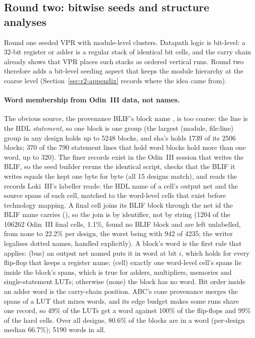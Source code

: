 \subsection{Round two: bitwise seeds and structure analyses}
\label{sec:r2-method}

Round one seeded VPR with module-level clusters. Datapath logic is bit-level: a
32-bit register or adder is a regular stack of identical bit cells, and the carry chain
already shows that VPR places such stacks as ordered vertical runs. Round two therefore
adds a bit-level seeding aspect that keeps the module hierarchy at the coarse level
(Section~\ref{sec:r2-appendix} records where the idea came from).

\paragraph{Word membership from Odin~III data, not names.}
The obvious source, the provenance BLIF's block name , is too
coarse: the line is the HDL \emph{statement}, so one  block is one group (the
largest (module, file:line) group in any design holds up to 5248 blocks,
and sha's holds 1739 of its 2506 blocks; 370 of the 790 statement lines that
hold word blocks hold more than one word, up to 320). The finer records exist in the Odin~III session that
writes the BLIF, so the seed builder reruns the identical script, checks that the BLIF it
writes equals the kept one byte for byte (all 15 designs
match), and reads the records Loki~III's labeller reads: the HDL name  of a
cell's output net and the source spans of each cell, matched to the word-level cells that
exist before technology mapping. A final cell joins its BLIF block through the net id the BLIF
name carries (), so the join is by identifier, not by string
(1204 of the 106262 Odin~III final cells, 1.1\%, found no BLIF block and are left unlabelled,
from none to 22.2\% per design, the worst being  with 942 of 4235;
the writer legalises dotted names, handled explicitly). A block's word is the first rule
that applies: (bus) an output net named  puts it in word  at bit $i$,
which holds for every flip-flop that keeps a register name; (cell) exactly one word-level cell's
spans lie inside the block's spans, which is true for adders, multipliers, memories and
single-statement LUTs; otherwise (none) the block has no word. Bit order inside an adder word is
the carry-chain position. ABC's cone provenance merges the spans of a LUT that mixes words,
and its edge budget makes some runs share one record, so 49\% of the LUTs get a word
against 100\% of the flip-flops and 99\% of the hard cells. Over all designs,
80.6\% of the blocks are in a word (per-design median
66.7\%); 5190 words in all.

